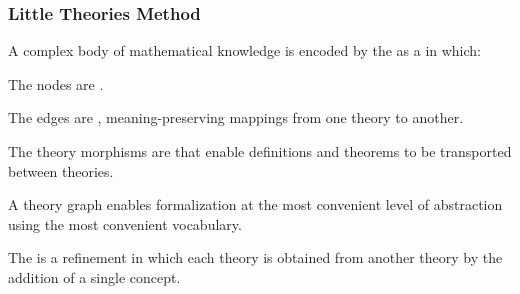 \documentclass[t,12pt,numbers,fleqn]{beamer}
\begin{document}

\begin{frame}
\frametitle{Little Theories Method {\small \bbrown{[FGT92]}}}
\bi

  \item A complex body of mathematical knowledge is encoded by the
     as a 
    \bbrown{[Kol14]} in which:

  \be

    \item The nodes are .

    \item The edges are , meaning-preserving
      mappings from one theory to another.

  \ee

  \item The theory morphisms are  that
    enable definitions and theorems to be transported between
    theories.

  \item A theory graph enables formalization at the most convenient
    level of abstraction using the most convenient vocabulary.

  \item The  is a refinement in which each
    theory is obtained from another theory by the addition of a single
    concept.

\ei
\end{frame}

\end{document}
